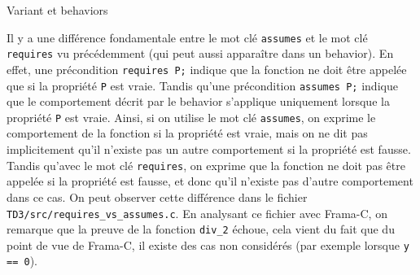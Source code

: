 \documentclass{article}
\begin{document}
\begin{Memo}{Variant et behaviors}{}
    \medskip

    Il y a une différence fondamentale entre le mot clé \texttt{assumes}
    et le mot clé \texttt{requires} vu précédemment (qui peut aussi
    apparaître dans un behavior).
    En effet, une précondition \texttt{requires P;} indique que la fonction
    ne doit être appelée que si la propriété \texttt{P} est vraie.
    Tandis qu'une précondition \texttt{assumes P;} indique que
    le comportement décrit par le behavior s'applique uniquement
    lorsque la propriété \texttt{P} est vraie.
    Ainsi, si on utilise le mot clé \texttt{assumes}, on exprime le comportement
    de la fonction si la propriété est vraie, mais on ne dit pas 
    implicitement qu'il n'existe pas un autre comportement si la propriété
    est fausse.
    Tandis qu'avec le mot clé \texttt{requires}, on exprime que
    la fonction ne doit pas être appelée si la propriété est fausse, et donc
    qu'il n'existe pas d'autre comportement dans ce cas.
    On peut observer cette différence dans le fichier \texttt{TD3/src/requires\_vs\_assumes.c}.
    En analysant ce fichier avec Frama-C, on remarque que la preuve
    de la fonction \texttt{div\_2} échoue, cela vient du fait que du point de vue de
    Frama-C, il existe des cas non considérés (par exemple lorsque \texttt{y == 0}).
\end{Memo}
\end{document}
